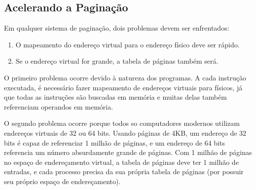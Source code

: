 \documentclass[10pt]{article}
\begin{document}
\subsection{Acelerando a Paginação}
\par \indent Em qualquer sistema de paginação, dois problemas devem ser enfrentados:
\begin{enumerate}
    \item O mapeamento do endereço virtual para o endereço físico deve ser rápido.
    \item Se o endereço virtual for grande, a tabela de páginas também será.
\end{enumerate}
\par O primeiro problema ocorre devido à natureza dos programas. A cada instrução
executada, é necessário fazer mapeamento de endereços virtuais para físicos, já
que todas as instruções são buscadas em memória e muitas delas também referenciam
operandos em memória.
\par O segundo problema ocorre porque todos so computadores modernos utilizam 
endereços virtuais de 32 ou 64 bits. Usando páginas de  4KB, um endereço de 32 bits
é capaz de referenciar 1 milhão de páginas, e um endereço de 64 bits referencia um 
número absurdamente grande de páginas. Com 1 milhão de páginas no espaço de endereçamento
virtual, a tabela de páginas deve ter 1 milhão de entradas, e cada processo precisa
da sua própria tabela de páginas (por possuir seu próprio espaço de endereçamento).
\end{document}
